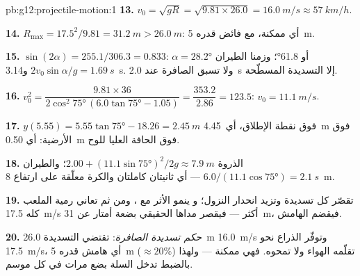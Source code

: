 \begin{solution}{pb:g12:projectile-motion:1}
\textbf{13.} $v_0 = \sqrt{gR} = \sqrt{9.81 \times 26.0} =
\qty{16.0}{m/s} \approx \qty{57}{km/h}$.

\textbf{14.} $R_{\max} = 17.5^2/9.81 = \qty{31.2}{m} >
\qty{26.0}{m}$: أي ممكنة، مع فائض  قدره \qty{5}{m}.

\textbf{15.} $\sin(2\alpha) = 255.1/306.3 = 0.833$:
$\alpha = \ang{28.2}$ أو \ang{61.8}؛ وزمنا الطيران
$2v_0\sin\alpha/g = \qty{1.69}{s}$ و\qty{3.14}{s}. ولا تسبق الصافرة عند
\qty{2.0}{s} إلا التسديدة المسطّحة.

\textbf{16.} $v_0^2 = \dfrac{9.81 \times 36}{2\cos^2\ang{75}\,
(6.0\tan\ang{75} - 1.05)} = \dfrac{353.2}{2.86} = 123.5$:
$v_0 = \qty{11.1}{m/s}$.

\textbf{17.} $y(5.55) = 5.55\tan\ang{75} - 18.26 = \qty{2.45}{m}$
فوق نقطة الإطلاق، أي\ \qty{4.45}{m} فوق الأرضية: أي \qty{0.50}{m}
فوق الحافة العليا للوح.

\textbf{18.} الذروة $2.00 + (11.1\sin\ang{75})^2/2g \approx
\qty{7.9}{m}$؛ والطيران $6.0/(11.1\cos\ang{75}) = \qty{2.1}{s}$ ---
أي ثانيتان كاملتان والكرة معلّقة على ارتفاع \qty{8}{m}.

\textbf{19.} تقصّر  كل تسديدة وتزيد انحدار النزول؛ و
ينمو الأثر مع ، ومن ثم تعاني رمية الملعب كله \qty{17.5}{m/s}
أكثر --- فيقصر مداها الحقيقي بضعة أمتار عن
\qty{31}{m}، فيقضم الهامش.

\textbf{20.} \emph{حكم تسديدة الصافرة}: تقتضي التسديدة \qty{26.0}{m}
 \qty{16.0}{m/s} وتوفّر الذراع نحو
\qty{17.5}{m/s}، أي هامش  قدره \qty{5}{m} ($\approx 20\%$)
تقلّمه  الهواء ولا تمحوه. فهي ممكنة --- ولهذا بالضبط
تدخل السلة بضع مرات في كل موسم.
\end{solution}
